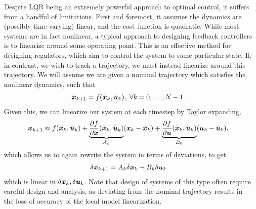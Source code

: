 Despite LQR being an extremely powerful approach to optimal control, it suffers from a handful of limitations. First and foremost, it assumes the dynamics are (possibly time-varying) linear, and the cost function is quadratic. While most systems are in fact nonlinear, a typical approach to designing feedback controllers is to linearize around some operating point. This is an effective method for designing regulators, which aim to control the system to some particular state. If, in contrast, we wish to track a trajectory, we must instead linearize around this trajectory. We will assume we are given a nominal trajectory which satisfies the nonlinear dynamics, such that
\begin{equation}
    \bar{\bm{x}}_{k+1} = f(\bar{\bm{x}}_k,\bar{\bm{u}}_k),\,\, \forall k = 0, \ldots, N-1. 
\end{equation}
Given this, we can linearize our system at each timestep by Taylor expanding,
\begin{equation}
    \bm{x}_{k+1} \approx f(\bar{\bm{x}}_k,\bar{\bm{u}}_k) + \underbrace{\frac{\partial f}{\partial \bm{x}} (\bar{\bm{x}}_k, \bar{\bm{u}}_k)}_{A_k} (\bm{x}_k - \bar{\bm{x}}_k) + \underbrace{\frac{\partial f}{\partial \bm{u}} (\bar{\bm{x}}_k, \bar{\bm{u}}_k)}_{B_k} (\bm{u}_k - \bar{\bm{u}}_k).
\end{equation}
which allows us to again rewrite the system in terms of deviations, to get
\begin{equation}
    \delta \bm{x}_{k+1} = A_k \delta \bm{x}_k + B_k \delta \bm{u}_k
\end{equation}
which is linear in $\delta \bm{x}_k, \delta \bm{u}_k$.  Note that design of systems of this type often require careful design and analysis, as deviating from the nominal trajectory results in the loss of accuracy of the local model linearization. 

